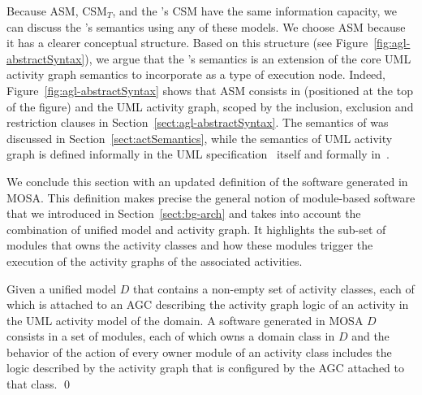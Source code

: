 Because ASM, CSM$_T$, and the \agl's CSM have the same information capacity, we can discuss the \agl's semantics using any of these models. We choose ASM because it has a clearer conceptual structure. Based on this structure (see Figure~\ref{fig:agl-abstractSyntax}), we argue that the \agl's semantics is an extension of the core UML activity graph semantics to incorporate  as a type of execution node. Indeed, Figure~\ref{fig:agl-abstractSyntax} shows that ASM consists in  (positioned at the top of the figure) and the UML activity graph, scoped by the inclusion, exclusion and restriction clauses in Section~\ref{sect:agl-abstractSyntax}. The semantics of  was discussed in Section~\ref{sect:actSemantics}, while the semantics of UML activity graph is defined informally in the UML specification~\cite{omg_unified_2015} itself and formally in~\cite{daw_extensible_2015}.

We conclude this section with an updated definition of the software generated in MOSA. This definition makes precise the general notion of module-based software that we introduced in Section~\ref{sect:bg-arch} and takes into account the combination of unified model and activity graph. It highlights the sub-set of modules that owns the activity classes and how these modules trigger the execution of the activity graphs of the associated activities.
%
\begin{definition} \label{def:software}
Given a unified model $D$ that contains a non-empty set of activity classes, each of which is attached to an AGC describing the activity graph logic of an activity in the UML activity model of the domain. A software generated in MOSA \wrt $D$ consists in a set of modules, each of which owns a domain class in $D$ and the behavior of the  action of every owner module of an activity class includes the logic described by the activity graph that is configured by the AGC attached to that class. \qed
\end{definition}



